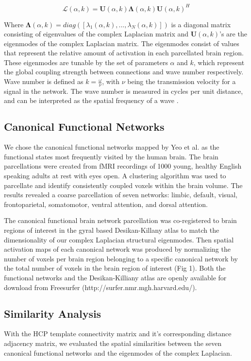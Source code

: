 \documentclass{article}
\begin{document}
\begin{equation}
\label{eq4}
\bm{\mathcal{L}}(\alpha, k) = \bm{U}(\alpha, k)\bm{\Lambda}(\alpha, k)\bm{U}(\alpha, k)^{H}
\end{equation}

Where $\bm{\Lambda}(\alpha, k) = diag([\lambda_{1}(\alpha, k), ... , \lambda_{N}(\alpha, k)])$ is a diagonal matrix consisting of eigenvalues of the complex Laplacian matrix and $\bm{U}(\alpha, k)$'s are the eigenmodes of the complex Laplacian matrix. The eigenmodes consist of values that represent the relative amount of activation in each parcellated brain region. These eigenmodes are tunable by the set of parameters $\alpha$ and $k$, which represent the global coupling strength between connections and wave number respectively. Wave number is defined as $k = \frac{\omega}{\nu}$, with $\nu$ being the transmission velocity for a signal in the network. The wave number is measured in cycles per unit distance, and can be interpreted as the spatial frequency of a wave \cite{French1971}. 

\subsection{Canonical Functional Networks}
We chose the canonical functional networks mapped by Yeo et al. \cite{Yeo2011} as the functional states most frequently visited by the human brain. The brain parcellations were created from fMRI recordings of 1000 young, healthy English speaking adults at rest with eyes open. A clustering algorithm was used to parcellate and identify consistently coupled voxels within the brain volume. The results revealed a coarse parcellation of seven networks: limbic, default, visual, frontoparietal, somatomotor, ventral attention, and dorsal attention. 

The canonical functional brain network parcellation was co-registered to brain regions of interest in the gyral based Desikan-Killany atlas \cite{Desikan2006} to match the dimensionality of our complex Laplacian structural eigenmodes. Then spatial activation maps of each canonical network was produced by normalizing the number of voxels per brain region belonging to a specific canonical network by the total number of voxels in the brain region of interest (Fig 1). Both the functional networks and the Desikan-Killiany atlas are openly available for download from Freesurfer \cite{Fischl2012} (http://surfer.nmr.mgh.harvard.edu/).

\subsection{Similarity Analysis}
With the HCP template connectivity matrix and it's corresponding distance adjacency matrix, we evaluated the spatial similarities between the seven canonical functional networks and the eigenmodes of the complex Laplacian. 
\end{document}
